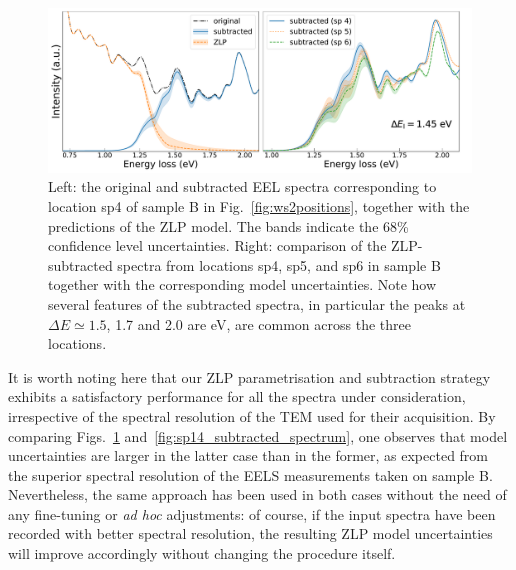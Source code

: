 \begin{figure}[t]
\begin{centering}
  \includegraphics[width=0.99\linewidth]{plots/subtractedEELS_plot_sampleB_sp4.pdf}
  \caption{Left: the original
     and subtracted EEL spectra corresponding to location sp4 of sample B in Fig.~\ref{fig:ws2positions},
     together with the predictions of the ZLP model.
     The bands indicate the 68\% confidence level uncertainties.
     Right: comparison of the ZLP-subtracted spectra from locations sp4, sp5, and sp6 in sample B
     together with the corresponding model uncertainties.
     Note how several features of the subtracted spectra, in particular
     the peaks at $\Delta E\simeq 1.5$,
    1.7 and 2.0 are eV, are common across the three locations.
  }
\label{fig:SubtractedEELS_plot_sp4}
\end{centering}
\end{figure}


It is worth noting here that our ZLP parametrisation and subtraction strategy exhibits a satisfactory
performance for all the spectra under consideration, irrespective of the spectral resolution of the TEM used
for their acquisition.
%
By comparing Figs.~\ref{fig:SubtractedEELS_plot_sp4} and~\ref{fig:sp14_subtracted_spectrum}, one observes
that  model uncertainties are larger in the latter case than in the former, as expected from the
superior 
spectral resolution of the EELS measurements taken on sample B.
%
Nevertheless, the same approach has been used in both cases without the need of any fine-tuning
or {\it ad hoc} adjustments: of course, if the input
spectra have been recorded with better spectral resolution, the resulting ZLP model uncertainties
will improve accordingly without changing the procedure itself.

